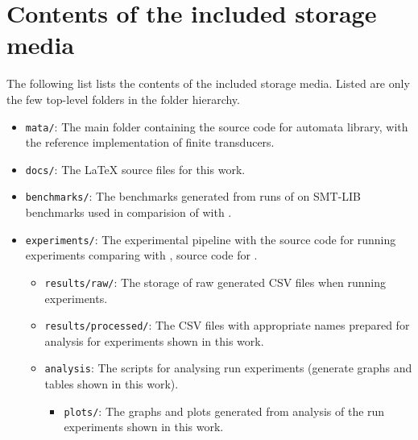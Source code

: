
%

\chapter{Contents of the included storage media}

The following list lists the contents of the included storage media. Listed are
only the few top-level folders in the folder hierarchy.

\begin{itemize}
	\item \texttt{mata/}: The main folder containing the source code for \mata automata library, with the reference implementation of finite transducers.
    \item \texttt{docs/}: The LaTeX source files for this work.
    \item \texttt{benchmarks/}: The benchmarks generated from runs of \noodler on SMT-LIB benchmarks used in comparision of \mata with \mona.
    \item \texttt{experiments/}: The experimental pipeline with the source code for running experiments comparing \mata with \mona, source code for \mona.
    \begin{itemize}
        \item \texttt{results/raw/}: The storage of raw generated CSV files when running experiments.

        \item \texttt{results/processed/}: The CSV files with appropriate names prepared for analysis for experiments shown in this work.

        \item \texttt{analysis}: The scripts for analysing run experiments (generate graphs and tables shown in this work).
        \begin{itemize}
          \item \texttt{plots/}: The graphs and plots generated from analysis of the run experiments shown in this work.
        \end{itemize}
    \end{itemize}
\end{itemize}

